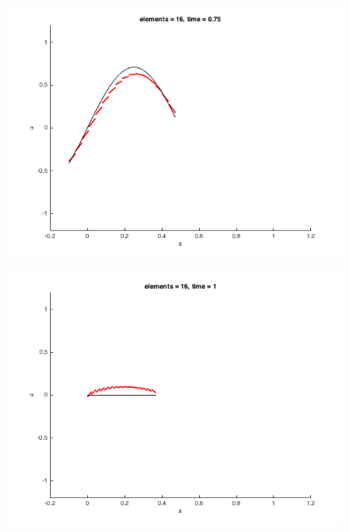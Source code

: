 \documentclass[11pt, oneside]{article}   	%
\begin{document}
\begin{figure}[h]
  \centering
  \includegraphics[width=\linewidth]{n16_t075.png}
\end{figure}

\begin{figure}[h]
  \centering
  \includegraphics[width=\linewidth]{n16_t100.png}
\end{figure}
\end{document}
